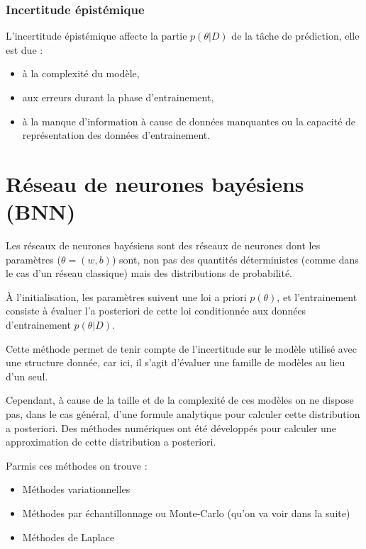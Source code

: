 \documentclass[french,12pt]{article}
\begin{document}
\subsubsection{Incertitude épistémique}

L'incertitude épistémique affecte la partie $p(\theta  | D)$ de la tâche de prédiction,
elle est due :

\begin{itemize}
    \item à la complexité du modèle,
    \item aux erreurs durant la phase d'entrainement,
    \item à la manque d'information à cause de données manquantes
          ou la capacité de représentation des données d'entrainement.
\end{itemize}

\pagebreak

\section{Réseau de neurones bayésiens (BNN)}


Les réseaux de neurones bayésiens sont des réseaux de neurones
dont les paramètres ($\theta = (w, b)$) sont, non pas des quantités déterministes (comme
dans le cas d'un réseau classique) mais des distributions de probabilité.

À l'initialisation, les paramètres suivent une loi a priori $p(\theta)$,
et l'entrainement consiste à évaluer l'a posteriori de cette loi conditionnée
aux données d'entrainement $p(\theta | D)$.

Cette méthode permet de tenir compte de l'incertitude sur le modèle utilisé
avec une structure donnée, car ici, il s'agit d'évaluer
une famille de modèles au lieu d'un seul.


Cependant, à cause de la taille et de la complexité de ces modèles
on ne dispose pas, dans le cas général, d'une formule analytique pour
calculer cette distribution a posteriori. Des méthodes numériques
ont été développés pour calculer une approximation de cette distribution a posteriori.

Parmis ces méthodes on trouve :
\begin{itemize}
    \item Méthodes variationnelles
    \item Méthodes par échantillonnage ou
          Monte-Carlo (qu'on va voir dans la suite)
    \item Méthodes de Laplace
\end{itemize}
\end{document}
